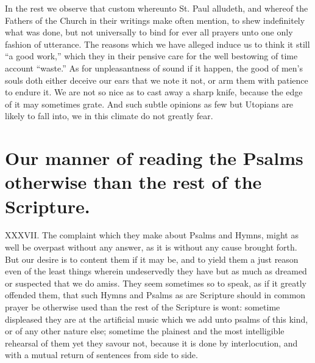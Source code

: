 In the rest we observe that custom whereunto St. Paul alludeth, and whereof the Fathers of the Church in their writings make often mention, to shew indefinitely what was  done, but not universally to bind for ever all prayers unto one only fashion of utterance.
The reasons which we have alleged induce us to think it still “a good work,” which they in their pensive care for the well bestowing of time account “waste.” As for unpleasantness of sound if it happen, the good of men’s souls doth either deceive our ears that we note it not, or arm them with patience to endure it. We are not so nice as to cast away a sharp knife, because the edge of it may sometimes grate. And such subtle opinions as few but Utopians are likely to fall into, we in this climate do not greatly fear.

\section*{Our manner of reading the Psalms otherwise than the rest of the Scripture.}
XXXVII. The complaint which they make about Psalms and Hymns, might as well be overpast without any answer, as it is without any cause brought forth. But our desire is to content them if it may be, and to yield them a just reason even of the least things wherein undeservedly they have but as much as dreamed or suspected that we do amiss. They seem sometimes so to speak, as if it greatly offended them, that such Hymns and Psalms as are Scripture should in common prayer be otherwise used than the rest of the Scripture is wont: sometime displeased they are at the artificial music which we add unto psalms of this kind, or of any other nature else; sometime the plainest and the most intelligible rehearsal of them yet they savour not, because it is done by interlocution, and with a mutual return of sentences from side to side.
